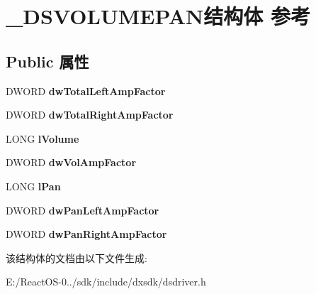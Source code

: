 \hypertarget{struct___d_s_v_o_l_u_m_e_p_a_n}{}\section{\+\_\+\+D\+S\+V\+O\+L\+U\+M\+E\+P\+A\+N结构体 参考}
\label{struct___d_s_v_o_l_u_m_e_p_a_n}
\subsection*{Public 属性}
\begin{DoxyCompactItemize}
\item 
\mbox{\label{struct___d_s_v_o_l_u_m_e_p_a_n_af55d5a7f2a7d1bb9bdbc41b746002647}} 
D\+W\+O\+RD {\bfseries dw\+Total\+Left\+Amp\+Factor}
\item 
\mbox{\label{struct___d_s_v_o_l_u_m_e_p_a_n_a5cf1d8d0090ed6cbce33d8e53ba142da}} 
D\+W\+O\+RD {\bfseries dw\+Total\+Right\+Amp\+Factor}
\item 
\mbox{\label{struct___d_s_v_o_l_u_m_e_p_a_n_aef81dfae289dce960ee3504704ba25c4}} 
L\+O\+NG {\bfseries l\+Volume}
\item 
\mbox{\label{struct___d_s_v_o_l_u_m_e_p_a_n_adc8e4884e39755f0805fde995e5cd3ed}} 
D\+W\+O\+RD {\bfseries dw\+Vol\+Amp\+Factor}
\item 
\mbox{\label{struct___d_s_v_o_l_u_m_e_p_a_n_a0c4b12a6c1b3acc44482a2fd0a57d011}} 
L\+O\+NG {\bfseries l\+Pan}
\item 
\mbox{\label{struct___d_s_v_o_l_u_m_e_p_a_n_a98836519a6c6bd88f2da04d3d1a8694a}} 
D\+W\+O\+RD {\bfseries dw\+Pan\+Left\+Amp\+Factor}
\item 
\mbox{\label{struct___d_s_v_o_l_u_m_e_p_a_n_a3873ca837837e2b65b67d3826df29caa}} 
D\+W\+O\+RD {\bfseries dw\+Pan\+Right\+Amp\+Factor}
\end{DoxyCompactItemize}


该结构体的文档由以下文件生成\+:\begin{DoxyCompactItemize}
\item 
E\+:/\+React\+O\+S-\/0../sdk/include/dxsdk/dsdriver.\+h\end{DoxyCompactItemize}
